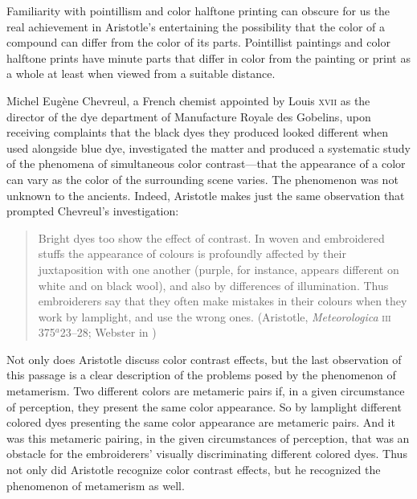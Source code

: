 Familiarity with pointillism and color halftone printing can obscure for us the real achievement in Aristotle's entertaining the possibility that the color of a compound can differ from the color of its parts. Pointillist paintings and color halftone prints have minute parts that differ in color from the painting or print as a whole at least when viewed from a suitable distance. 

Michel Eugène Chevreul, a French chemist appointed by Louis \textsc{xvii} as the director of the dye department of Manufacture Royale des Gobelins, upon receiving complaints that the black dyes they produced looked different when used alongside blue dye, investigated the matter and produced a systematic study of the phenomena of simultaneous color contrast---that the appearance of a color can vary as the color of the surrounding scene varies. The phenomenon was not unknown to the ancients. Indeed, Aristotle makes just the same observation that prompted Chevreul's investigation: 
\begin{quote}
	Bright dyes too show the effect of contrast. In woven and embroidered stuffs the appearance of colours is profoundly affected by their juxtaposition with one another (purple, for instance, appears different on white and on black wool), and also by differences of illumination. Thus embroiderers say that they often make mistakes in their colours when they work by lamplight, and use the wrong ones. (Aristotle, \emph{Meteorologica} \textsc{iii} 375\( ^{a} \)23--28; Webster in \citealt[61]{Barnes:1984uq})
\end{quote}
Not only does Aristotle discuss color contrast effects, but the last observation of this passage is a clear description of the problems posed by the phenomenon of metamerism. Two different colors are metameric pairs if, in a given circumstance of perception, they present the same color appearance. So by lamplight different colored dyes presenting the same color appearance are metameric pairs. And it was this metameric pairing, in the given circumstances of perception, that was an obstacle for the embroiderers' visually discriminating different colored dyes. Thus not only did Aristotle recognize color contrast effects, but he recognized the phenomenon of metamerism as well.

